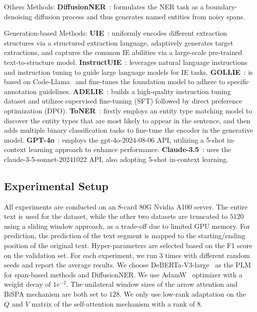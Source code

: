 Others Methods: 
\textbf{DiffusionNER}~\cite{shen2023diffusionner}: formulates the NER task as a boundary-denoising diffusion process and thus generates named entities from noisy spans.

Generation-based Methods: 
\textbf{UIE}~\cite{lu2022unified}: uniformly encodes different extraction structures via a structured extraction language, adaptively generates target extractions, and captures the common IE abilities via a large-scale pre-trained text-to-structure model.
\textbf{InstructUIE}~\cite{wang2023instructuie}: leverages natural language instructions and instruction tuning to guide large language models for IE tasks.
\textbf{GOLLIE}~\cite{sainz2023gollie}: is based on Code-Llama~\cite{roziere2023code} and fine-tunes the foundation model to adhere to specific annotation guidelines.
\textbf{ADELIE}~\cite{qi2024adelie}: 
builds a high-quality instruction tuning dataset and utilizes supervised fine-tuning (SFT) followed by direct preference optimization (DPO).
\textbf{ToNER}~\cite{jiang2024toner}: firstly employs an entity type matching model to discover the entity types that are most likely to appear in the sentence, 
and then adds multiple binary classification tasks to fine-tune the encoder in the generative model.
\textbf{GPT-4o}~\cite{achiam2023gpt}: employs the gpt-4o-2024-08-06 API, utilizing a 5-shot in-context learning approach to enhance performance.
\textbf{Claude-3.5}~\cite{TheC3}: uses the claude-3-5-sonnet-20241022 API, also adopting 5-shot in-context learning.


\subsection{Experimental Setup}

All experiments are conducted on an 8-card 80G Nvidia A100 server. 
The entire text is used for the \profiling dataset, while the other two datasets are truncated to $5120$ using a sliding window approach, as a trade-off due to limited GPU memory.
For prediction, %
the prediction of the text segment is mapped to the starting/ending position of the original text.
Hyper-parameters are selected based on the F1 score on the validation set.
For each experiment, we run $3$ times with different random seeds and report the average results.
We choose DeBERTa-V3-large~\cite{he2023debertav3improvingdebertausing} as the PLM for span-based methods and DiffusionNER. 
We use AdamW~\cite{loshchilov2017fixing} optimizer with a weight decay of $1e^{-2}$. 
The unilateral window sizes of the arrow attention and BiSPA mechanism are both set to $128$. 
We only use low-rank adaptation on the $Q$ and $V$ matrix of the self-attention mechanism with a rank of $8$. 

